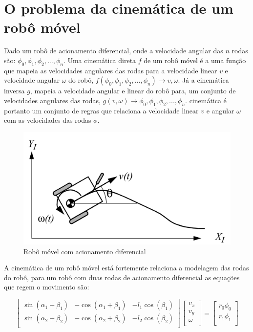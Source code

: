 
\label{Cap:Teoria}

\section{O problema da cinemática de um robô móvel}
Dado um robô de acionamento diferencial, onde a velocidade
angular das $n$ rodas são: $\phi_0,\phi_1,\phi_2,...,\phi_n$.
Uma cinemática direta $f$ de um robô móvel é a uma função que mapeia as
velocidades
angulares das rodas para a velocidade linear $v$ e velocidade angular $\omega$
do robô, $f(\phi_0,\phi_1,\phi_2,...,\phi_n) \rightarrow v,\omega$. Já
a cinemática inversa $g$, mapeia a velocidade angular e linear do robô para, um
conjunto de velocidades angulares das rodas, $g(v,\omega) \rightarrow  \phi_0,\phi_1,\phi_2,...,\phi_n$.
cinemática é portanto um conjunto de regras que relaciona a velocidade
linear $v$ e angular $\omega$
com as velocidades das rodas $\phi$.

\begin{figure}[H]
    \centering
    \includegraphics[scale=0.9]{figuras/robo.png}
    \caption[]{Robô móvel com acionamento diferencial}
\end{figure}

A cinemática de um robô móvel está fortemente relaciona a modelagem
das rodas do robô, para um robô com duas rodas de acionamento diferencial
as equações que regem o movimento são:

\[
\begin{bmatrix}
    \sin(\alpha_{1} + \beta_{1}) &  -\cos(\alpha_{1} + \beta_{1}) &  -l_1\cos(\beta_{1})\\
    \sin(\alpha_{2} + \beta_{2}) &  -\cos(\alpha_{2} + \beta_{2}) &  -l_2\cos(\beta_{2})\\
\end{bmatrix}
\begin{bmatrix}
    v_x \\
    v_y \\
    \omega\\
\end{bmatrix}
=
\begin{bmatrix}
    r_0\phi_0 \\
    r_1\phi_1 \\
\end{bmatrix}
\]


